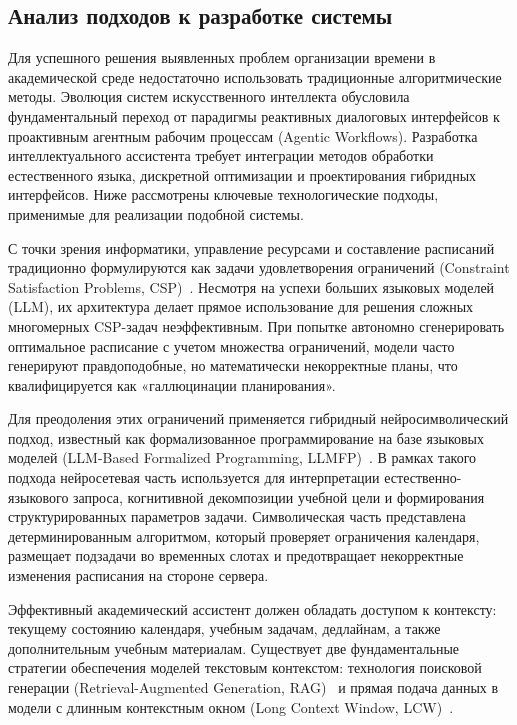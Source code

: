 \subsection{Анализ подходов к разработке системы}

Для успешного решения выявленных проблем организации времени в академической среде недостаточно использовать традиционные алгоритмические методы. Эволюция систем искусственного интеллекта обусловила фундаментальный переход от парадигмы реактивных диалоговых интерфейсов к проактивным агентным рабочим процессам (Agentic Workflows). Разработка интеллектуального ассистента требует интеграции методов обработки естественного языка, дискретной оптимизации и проектирования гибридных интерфейсов. Ниже рассмотрены ключевые технологические подходы, применимые для реализации подобной системы.

\numberedparagraph
С точки зрения информатики, управление ресурсами и составление расписаний традиционно формулируются как задачи удовлетворения ограничений (Constraint Satisfaction Problems, CSP)~\cite{Rossi1999}. Несмотря на успехи больших языковых моделей (LLM), их архитектура делает прямое использование для решения сложных многомерных CSP-задач неэффективным. При попытке автономно сгенерировать оптимальное расписание с учетом множества ограничений, модели часто генерируют правдоподобные, но математически некорректные планы, что квалифицируется как «галлюцинации планирования».

Для преодоления этих ограничений применяется гибридный нейросимволический подход, известный как формализованное программирование на базе языковых моделей (LLM-Based Formalized Programming, LLMFP)~\cite{Hao2025}. В рамках такого подхода нейросетевая часть используется для интерпретации естественно-языкового запроса, когнитивной декомпозиции учебной цели и формирования структурированных параметров задачи. Символическая часть представлена детерминированным алгоритмом, который проверяет ограничения календаря, размещает подзадачи во временных слотах и предотвращает некорректные изменения расписания на стороне сервера.

\numberedparagraph
Эффективный академический ассистент должен обладать доступом к контексту: текущему состоянию календаря, учебным задачам, дедлайнам, а также дополнительным учебным материалам. Существует две фундаментальные стратегии обеспечения моделей текстовым контекстом: технология поисковой генерации (Retrieval-Augmented Generation, RAG)~\cite{Lewis2020} и прямая подача данных в модели с длинным контекстным окном (Long Context Window, LCW)~\cite{Liu2023}.

